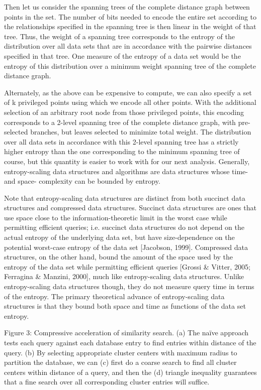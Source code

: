\documentclass{amsbook}
\theoremstyle{definition}
\theoremstyle{remark}
\numberwithin{equation}{section}
\begin{document}
Then let us consider the spanning trees of the complete distance graph between points in the set.
The number of bits needed to encode the entire set according to the relationships specified in the spanning tree is then linear in the weight of that tree.
Thus, the weight of a spanning tree corresponds to the entropy of the distribution over all data sets that are in accordance with the pairwise distances specified in that tree.
One measure of the entropy of a data set would be the entropy of this distribution over a minimum weight spanning tree of the complete distance graph.

Alternately, as the above can be expensive to compute, we can also specify a set of k privileged points using which we encode all other points.
With the additional selection of an arbitrary root node from those privileged points, this encoding corresponds to a 2-level spanning tree of the complete distance graph, with pre-selected branches, but leaves selected to minimize total weight.
The distribution over all data sets in accordance with this 2-level spanning tree has a strictly higher entropy than the one corresponding to the minimum spanning tree of course, but this quantity is easier to work with for our next analysis.
Generally, entropy-scaling data structures and algorithms are data structures whose time- and space- complexity can be bounded by entropy.

Note that entropy-scaling data structures are distinct from both succinct data structures and compressed data structures.
Succinct data structures are ones that use space close to the information-theoretic limit in the worst case while permitting efficient queries; i.e.
succinct data structures do not depend on the actual entropy of the underlying data set, but have size-dependence on the potential worst-case entropy of the data set [Jacobson, 1999].
Compressed data structures, on the other hand, bound the amount of the space used by the entropy of the data set while permitting efficient queries [Grossi \& Vitter, 2005; Ferragina \& Manzini, 2000], much like entropy-scaling data structures.
Unlike entropy-scaling data structures though, they do not measure query time in terms of the entropy.
The primary theoretical advance of entropy-scaling data structures is that they bound both space and time as functions of the data set entropy.


Figure 3: Compressive acceleration of similarity search.
(a) The naïve approach tests each query against each database entry to find entries within distance  of the query.
(b) By selecting appropriate cluster centers with maximum radius  to partition the database, we can (c) first do a coarse search to find all cluster centers within distance  of a query, and then the (d) triangle inequality guarantees that a fine search over all corresponding cluster entries will suffice.
\end{document}
